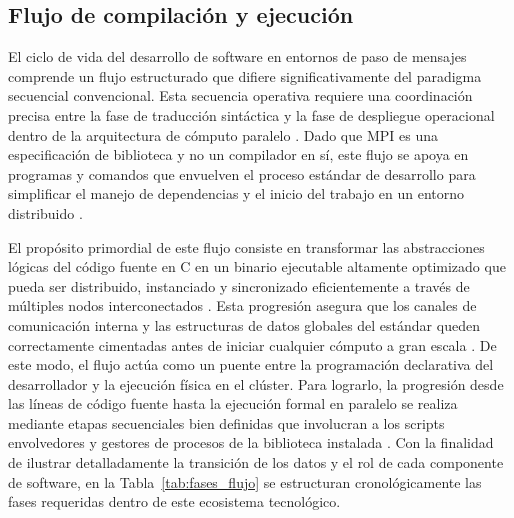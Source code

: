 \subsection{Flujo de compilación y ejecución}

El ciclo de vida del desarrollo de software en entornos de paso de mensajes comprende un flujo estructurado que difiere significativamente del paradigma secuencial convencional. Esta secuencia operativa requiere una coordinación precisa entre la fase de traducción sintáctica y la fase de despliegue operacional dentro de la arquitectura de cómputo paralelo \cite{pacheco_2011}. Dado que MPI es una especificación de biblioteca y no un compilador en sí, este flujo se apoya en programas y comandos que envuelven el proceso estándar de desarrollo para simplificar el manejo de dependencias y el inicio del trabajo en un entorno distribuido \cite{mpi_forum_2025, open_mpi_2026}.

El propósito primordial de este flujo consiste en transformar las abstracciones lógicas del código fuente en C en un binario ejecutable altamente optimizado que pueda ser distribuido, instanciado y sincronizado eficientemente a través de múltiples nodos interconectados \cite{gropp_using_mpi_1999}. Esta progresión asegura que los canales de comunicación interna y las estructuras de datos globales del estándar queden correctamente cimentadas antes de iniciar cualquier cómputo a gran escala \cite{mpi_forum_2025}. De este modo, el flujo actúa como un puente entre la programación declarativa del desarrollador y la ejecución física en el clúster. Para lograrlo, la progresión desde las líneas de código fuente hasta la ejecución formal en paralelo se realiza mediante etapas secuenciales bien definidas que involucran a los scripts envolvedores y gestores de procesos de la biblioteca instalada \cite{grama_intro_parallel_2003}. Con la finalidad de ilustrar detalladamente la transición de los datos y el rol de cada componente de software, en la Tabla~\ref{tab:fases_flujo} se estructuran cronológicamente las fases requeridas dentro de este ecosistema tecnológico.

